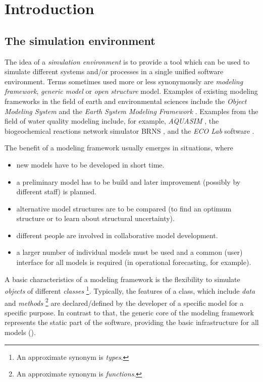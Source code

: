 \chapter{Introduction} \label{chap:intro}
\renewcommand{\tabdir}{chapters/intro/tab}
\renewcommand{\figdir}{chapters/intro/fig}

\section{The  simulation environment} \label{sec:intro_idea}

The idea of a \emph{simulation environment} is to provide a tool which can be used to simulate different systems and/or processes in a single unified software environment. Terms sometimes used more or less synonymously are \emph{modeling framework}, \emph{generic model} or \emph{open structure} model. Examples of existing modeling frameworks in the field of earth and environmental sciences include the \emph{Object Modeling System} \citep{Ahuja2005} and the \emph{Earth System Modeling Framework} \citep{Hill2004}. Examples from the field of water quality modeling include, for example, \emph{AQUASIM} \citep{Reichert1998}, the biogeochemical reactions network simulator BRNS \citep{Regnier2002, Thullner2005}, and the \emph{ECO Lab} software \citep{DHI2006}.

The benefit of a modeling framework usually emerges in situations, where
\begin{itemize}
  \item new models have to be developed in short time.
  \item a preliminary model has to be build and later improvement (possibly by different staff) is planned.
  \item alternative model structures are to be compared (to find an optimum structure or to learn about structural uncertainty).
  \item different people are involved in collaborative model development.
  \item a larger number of individual models must be used and a common (user) interface for all models is required (in operational forecasting, for example).
\end{itemize}

A basic characteristics of a modeling framework is the flexibility to simulate \emph{objects} of different \emph{classes} \footnote{An approximate synonym is \emph{types}.}. Typically, the features of a class, which include \emph{data} and \emph{methods} \footnote{An approximate synonym is \emph{functions}.} are declared/defined by the developer of a specific model for a specific purpose. In contrast to that, the generic core of the modeling framework represents the static part of the software, providing the basic infrastructure for all models ().

